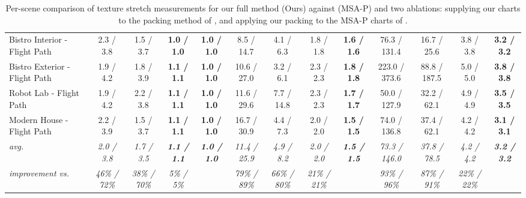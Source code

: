 \begin{table*}[t]
\begin{tabular}{l cccc|cccc|cccc}
	Bistro Interior - Flight Path & 2.3 / 3.8            & 1.5 / 3.7            & \textbf{1.0 / 1.0}          & \textbf{1.0 / 1.0}          & 8.5 / 14.7           & 4.1 / 6.3            & 1.8 / 1.8            & \textbf{1.6 / 1.6}          & 76.3 / 131.4          & 16.7 / 25.6          & 3.8 / 3.8            & \textbf{3.2 / 3.2}          \\
	Bistro Exterior - Flight Path & 1.9 / 4.2            & 1.8 / 3.9            & \textbf{1.1 / 1.1}          & \textbf{1.0 / 1.0}          & 10.6 / 27.0          & 3.2 / 6.1            & 2.3 / 2.3            & \textbf{1.8 / 1.8}          & 223.0 / 373.6         & 88.8 / 187.5         & 5.0 / 5.0            & \textbf{3.8 / 3.8}          \\
	Robot Lab - Flight Path       & 1.9 / 4.2            & 2.2 / 3.8            & \textbf{1.1 / 1.1}          & \textbf{1.0 / 1.0}          & 11.6 / 29.6          & 7.7 / 14.8           & 2.3 / 2.3            & \textbf{1.7 / 1.7}          & 50.0 / 127.9          & 32.2 / 62.1          & 4.9 / 4.9            & \textbf{3.5 / 3.5}          \\
	Modern House - Flight Path    & 2.2 / 3.9            & 1.5 / 3.7            & \textbf{1.1 / 1.1}          & \textbf{1.0 / 1.0}          & 16.7 / 30.9          & 4.4 / 7.3            & 2.0 / 2.0            & \textbf{1.5 / 1.5}          & 74.0 / 136.8          & 37.4 / 62.1          & 4.2 / 4.2            & \textbf{3.1 / 3.1}          \\
	\hline
	\textit{avg.}                 & \textit{2.0 / 3.8}   & \textit{1.7 / 3.5}   & \textit{\textbf{1.1 / 1.1}} & \textit{\textbf{1.0 / 1.0}} & \textit{11.4 / 25.9} & \textit{4.9 / 8.2}   & \textit{2.0 / 2.0}   & \textit{\textbf{1.5 / 1.5}} & \textit{73.3 / 146.0} & \textit{37.8 / 78.5} & \textit{4.2 / 4.2}   & \textit{\textbf{3.2 / 3.2}} \\
	\textit{improvement vs.}      & \textit{46\% / 72\%} & \textit{38\% / 70\%} & \textit{5\% / 5\%}          & \textit{}                   & \textit{79\% / 89\%} & \textit{66\% / 80\%} & \textit{21\% / 21\%} & \textit{}                   & \textit{93\% / 96\%}  & \textit{87\% / 91\%} & \textit{22\% / 22\%} & \textit{}                  
\end{tabular}
\vspace{1mm}
\caption{Per-scene comparison of texture stretch measurements for our full method (Ours) against \cite{Neff2022MSA} (MSA-P) and two ablations: supplying our charts to the packing method of \cite{Neff2022MSA}, and applying our packing to the MSA-P charts of \cite{Neff2022MSA}.}
\label{tab:supp_texture_stretch_ablation}
\vspace{-3mm}
\end{table*}
